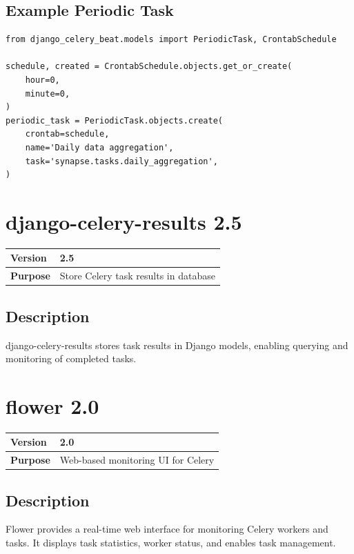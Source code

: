 \documentclass[12pt,a4paper]{report}
\begin{document}
\subsection{Example Periodic Task}

\begin{lstlisting}
from django_celery_beat.models import PeriodicTask, CrontabSchedule

schedule, created = CrontabSchedule.objects.get_or_create(
    hour=0,
    minute=0,
)
periodic_task = PeriodicTask.objects.create(
    crontab=schedule,
    name='Daily data aggregation',
    task='synapse.tasks.daily_aggregation',
)
\end{lstlisting}

\section{django-celery-results 2.5}

\begin{tabular}{|p{4cm}|p{10cm}|}
\hline
\textbf{Version} & 2.5 \\
\hline
\textbf{Purpose} & Store Celery task results in database \\
\hline
\end{tabular}

\subsection{Description}

django-celery-results stores task results in Django models, enabling querying and monitoring of completed tasks.

\section{flower 2.0}

\begin{tabular}{|p{4cm}|p{10cm}|}
\hline
\textbf{Version} & 2.0 \\
\hline
\textbf{Purpose} & Web-based monitoring UI for Celery \\
\hline
\end{tabular}

\subsection{Description}

Flower provides a real-time web interface for monitoring Celery workers and tasks. It displays task statistics, worker status, and enables task management.
\end{document}
